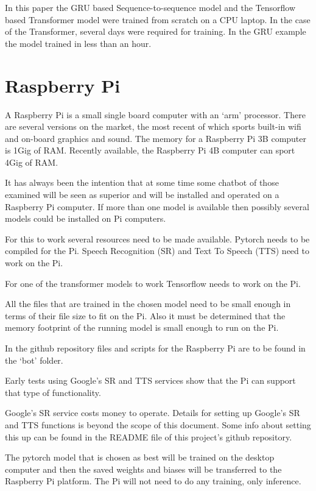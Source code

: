 In this paper the GRU based Sequence-to-sequence model and the Tensorflow based Transformer model were trained from scratch on a CPU laptop. In the case of the Transformer, several days were required for training. In the GRU example the model trained in less than an hour.

\section{Raspberry Pi}

A Raspberry Pi is a small single board computer with an `arm' processor. There are several versions on the market, the most recent of which sports built-in wifi and on-board graphics and sound. The memory for a Raspberry Pi 3B computer is 1Gig of RAM. Recently available, the Raspberry Pi 4B computer can sport 4Gig of RAM.

It has always been the intention that at some time some chatbot of those examined will be seen as superior and will be installed and operated on a Raspberry Pi computer. If more than one model is available then possibly several models could be installed on Pi computers.

For this to work several resources need to be made available. Pytorch needs to be compiled for the Pi. Speech Recognition (\ac{SR}) and Text To Speech (TTS) need to work on the Pi.

For one of the transformer models to work Tensorflow needs to work on the Pi.

All the files that are trained in the chosen model need to be small enough in terms of their file size to fit on the Pi. Also it must be determined that the memory footprint of the running model is small enough to run on the Pi.

In the github repository files and scripts for the Raspberry Pi are to be found in the \textquoteleft bot\textquoteright{} folder.

Early tests using Google\textquoteright s SR and TTS services show that the Pi can support that type of functionality. 

Google's SR service costs money to operate. Details for setting up Google's SR and TTS functions is beyond the scope of this document. Some info about setting this up can be
found in the README file of this project\textquoteright s github repository.

The pytorch model that is chosen as best will be trained on the desktop computer and then the saved weights and biases will be transferred to the Raspberry Pi platform. The Pi will not need to do any training, only inference. 

